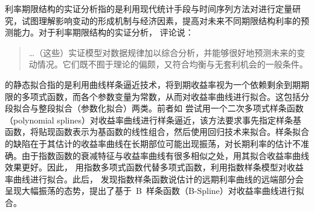 利率期限结构的实证分析指的是利用现代统计手段与时间序列方法对\ts 进行定量研究，试图理解影响\tsm 变动的形成机制与经济因素，提高对未来不同期限结构利率的预测能力。对于利率期限结构的实证分析， 评论说：
\begin{quotation}
  \ldots{}（这些）实证模型对数据规律加以综合分析，并能够很好地预测未来\yc 的变动情况。它们既不囿于理论的偏颇，又符合均衡与无套利机会的一般条件。
\end{quotation}

\tsm 的静态拟合指的是利用曲线样条逼近技术，将到期收益率视为一个依赖剩余到期期限的多项式函数，而各个参数变量为常数，从而对收益率曲线进行拟合。这包括分段拟合与整段拟合（参数化拟合）两类。前者如 尝试用一个二次多项式样条函数（polynomial splines）对收益率曲线进行样条逼近，该方法要求事先指定样条基函数，将贴现函数表示为基函数的线性组合，然后使用回归技术来拟合。样条拟合的缺陷在于其估计的收益率曲线在长期部位可能出现振荡，对长期利率的估计不准确。由于指数函数的衰减特征与收益率曲线有很多相似之处，用其拟合收益率曲线效果更好。因此， 用指数多项式函数代替多项式函数，利用指数样条模型对收益率曲线进行拟合。此后， 发现指数样条函数说估计的远期利率曲线的远端部分会呈现大幅振荡的态势，提出了基于~B~样条函数（B-Spline）对收益率曲线进行拟合。


